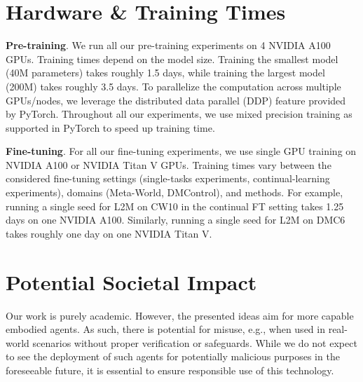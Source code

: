 \section{Hardware \& Training Times}
\textbf{Pre-training}. We run all our pre-training experiments on 4 NVIDIA A100 GPUs. Training times depend on the model size. 
Training the smallest model (40M parameters) takes roughly 1.5 days, while training the largest model (200M) takes roughly 3.5 days. To parallelize the computation across multiple GPUs/nodes, we leverage the distributed data parallel (DDP) feature provided by PyTorch. Throughout all our experiments, we use mixed precision training \citep{micikevicius2017mixed} as supported in PyTorch to speed up training time. 

\textbf{Fine-tuning}. For all our fine-tuning experiments, we use single GPU training on NVIDIA A100 or NVIDIA Titan V GPUs. Training times vary between the considered fine-tuning settings (single-tasks experiments, continual-learning experiments), domains (Meta-World, DMControl), and methods. For example, running a single seed for L2M on CW10 in the continual FT setting takes 1.25 days on one NVIDIA A100. Similarly, running a single seed for L2M on DMC6 takes roughly one day on one NVIDIA Titan V. 

\section{Potential Societal Impact}
Our work is purely academic. 
However, the presented ideas aim for more capable embodied agents. 
As such, there is potential for misuse, e.g., when used in real-world scenarios without proper verification or safeguards. 
While we do not expect to see the deployment of such agents for potentially malicious purposes in the foreseeable future, it is essential to ensure responsible use of this technology.